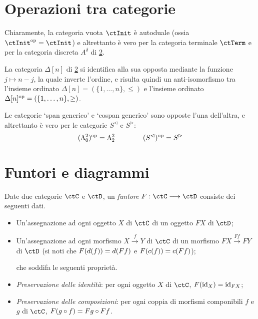 \section{Operazioni tra categorie}

\begin{remark}
	Chiaramente, la categoria vuota \(\ctInit\) è autoduale (ossia $\ctInit^\op=\ctInit$) e altrettanto è vero per la categoria terminale $\ctTerm$ e per la categoria discreta $A^\delta$ di \ref{}.

	La categoria $\Delta[n]$ di \ref{} si identifica alla sua opposta mediante la funzione $j\mapsto n-j$, la quale inverte l'ordine, e risulta quindi un anti-isomorfismo tra l'insieme ordinato $\Delta[n]=(\{1,\dots,n\},\le)$ e l'insieme ordinato $\Delta[n]^{\text{op}} = (\{1,\dots,n\},\ge)$.

	Le categorie `span generico' e `cospan generico' sono opposte l'una dell'altra, e altrettanto è vero per le categorie $S^\lhd$ e $S^\rhd$:
	\[(\Lambda^2_0)^{\text{op}} = \Lambda^2_2\qquad\qquad (S^\lhd)^{\text{op}} = S^\rhd\]
\end{remark}

\section{Funtori e diagrammi}

\begin{definition}[Funtore]\label{def_funtore}
	Date due categorie \(\ctC\) e \(\ctD\), un \emph{funtore} \(F:\ctC\fun\ctD\) consiste dei seguenti dati.
	\begin{itemize}
		\item Un'assegnazione ad ogni oggetto \(X\) di \(\ctC\) di un oggetto \(FX\) di \(\ctD\);
		\item Un'assegnazione ad ogni morfismo \(X \xrightarrow{f} Y\) di \(\ctC\) di un morfismo \(FX \xrightarrow{Ff} FY\) di \(\ctD\) (si noti che \(F(d(f))=d(Ff)\) e \(F(c(f))=c(Ff)\));

		      che soddifa le seguenti proprietà.
		\item \emph{Preservazione delle identità}: per ogni oggetto \(X\) di \(\ctC\), \(F(\mathrm{id}_X)=\mathrm{id}_{FX}\);
		\item \emph{Preservazione delle composizioni}: per ogni coppia di morfismi componibili \(f\) e \(g\) di \(\ctC\), \(F(g\circ f)=Fg\circ Ff\).
	\end{itemize}
\end{definition}

